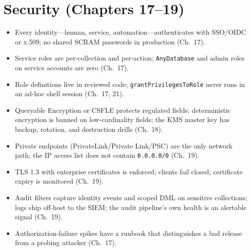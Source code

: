 \section{Security (Chapters 17--19)}
%
\begin{itemize}
    \item[$\square$] Every identity---human, service, automation---authenticates with SSO/OIDC or x.509; no shared SCRAM passwords in production (Ch.~17).
    \item[$\square$] Service roles are per-collection and per-action; \texttt{AnyDatabase} and admin roles on service accounts are zero (Ch.~17).
    \item[$\square$] Role definitions live in reviewed code; \texttt{grantPrivilegesToRole} never runs in an ad-hoc shell session (Ch.~17, 21).
    \item[$\square$] Queryable Encryption or CSFLE protects regulated fields; deterministic encryption is banned on low-cardinality fields; the KMS master key has backup, rotation, and destruction drills (Ch.~18).
    \item[$\square$] Private endpoints (PrivateLink/Private Link/PSC) are the only network path; the IP access list does not contain \texttt{0.0.0.0/0} (Ch.~19).
    \item[$\square$] TLS 1.3 with enterprise certificates is enforced; clients fail closed; certificate expiry is monitored (Ch.~19).
    \item[$\square$] Audit filters capture identity events and scoped DML on sensitive collections; logs ship off-host to the SIEM; the audit pipeline's own health is an alertable signal (Ch.~19).
    \item[$\square$] Authorization-failure spikes have a runbook that distinguishes a bad release from a probing attacker (Ch.~17).
\end{itemize}

